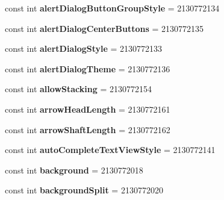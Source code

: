 \begin{DoxyCompactItemize}
const int {\bfseries alert\+Dialog\+Button\+Group\+Style} = 2130772134
\item 
\mbox{\label{classXaria_1_1Resource_1_1Attribute_aa0613ca2de0c1c246980f70da7d1f3cb}} 
const int {\bfseries alert\+Dialog\+Center\+Buttons} = 2130772135
\item 
\mbox{\label{classXaria_1_1Resource_1_1Attribute_a9ad25337c74a0a3d65fdad35997a82d2}} 
const int {\bfseries alert\+Dialog\+Style} = 2130772133
\item 
\mbox{\label{classXaria_1_1Resource_1_1Attribute_ad51f15a99c7a0a3645067a4c64f30fcc}} 
const int {\bfseries alert\+Dialog\+Theme} = 2130772136
\item 
\mbox{\label{classXaria_1_1Resource_1_1Attribute_a99c74aea532e5c731ba066d76302ddac}} 
const int {\bfseries allow\+Stacking} = 2130772154
\item 
\mbox{\label{classXaria_1_1Resource_1_1Attribute_aab8d9cb67a696080aaa46afa9764fc20}} 
const int {\bfseries arrow\+Head\+Length} = 2130772161
\item 
\mbox{\label{classXaria_1_1Resource_1_1Attribute_a6a13e06ad22bee9d3c0764a3c1accb3c}} 
const int {\bfseries arrow\+Shaft\+Length} = 2130772162
\item 
\mbox{\label{classXaria_1_1Resource_1_1Attribute_a1c7b0d1b92090e89bdc99c03d23f4d2b}} 
const int {\bfseries auto\+Complete\+Text\+View\+Style} = 2130772141
\item 
\mbox{\label{classXaria_1_1Resource_1_1Attribute_a5cfcb4cca15c6d64ef00137c550a264d}} 
const int {\bfseries background} = 2130772018
\item 
\mbox{\label{classXaria_1_1Resource_1_1Attribute_a546abcf313166f55325ec29317e64f80}} 
const int {\bfseries background\+Split} = 2130772020
\item 
\mbox{\label{classXaria_1_1Resource_1_1Attribute_a9019b32bd16a22f364c2a71258216593}} 

\end{DoxyCompactItemize}
